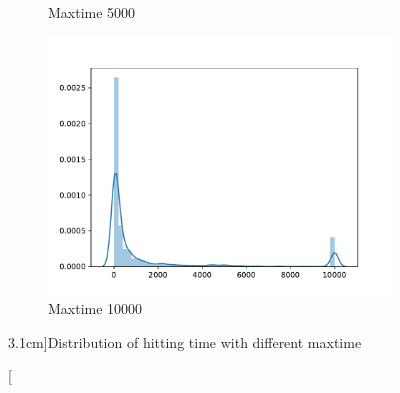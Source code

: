 \begin{subproblem}[\roman*)]
\begin{figure}[h]
\begin{subfigure}[b]{0.3\textwidth}
                \caption{Maxtime 5000}
            \end{subfigure}
            \begin{subfigure}[b]{0.3\textwidth}
                \includegraphics[width=\textwidth]{max=10000}
                \caption{Maxtime 10000}
            \end{subfigure}
            \caption[][3.1cm]{Distribution of hitting time with different maxtime}
            \label{fig:dist}
        \end{figure}
    \end{subproblem}

